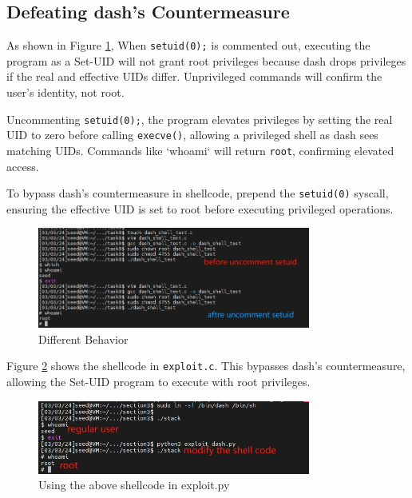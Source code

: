 \documentclass[a4paper,11pt]{article}
\begin{document}
\subsection{Defeating dash’s Countermeasure}

As shown in Figure \ref{fig:task11.1}, When \verb|setuid(0);| is commented out, executing the program as a Set-UID will not grant root privileges because dash drops privileges if the real and effective UIDs differ. Unprivileged commands will confirm the user's identity, not root.

Uncommenting \verb|setuid(0);|, the program elevates privileges by setting the real UID to zero before calling \verb|execve()|, allowing a privileged shell as dash sees matching UIDs. Commands like `whoami` will return \verb|root|, confirming elevated access.

To bypass dash's countermeasure in shellcode, prepend the \verb|setuid(0)| syscall, ensuring the effective UID is set to root before executing privileged operations.
\begin{figure}[h]
    \centering
       \includegraphics[width=0.8\textwidth]{figures/task11/task11.1.png}
    \caption{Different Behavior}\label{fig:task11.1}
\end{figure}

Figure \ref{fig:task11.2} shows the shellcode in \verb|exploit.c|. This bypasses dash's countermeasure, allowing the Set-UID program to execute with root privileges.
\begin{figure}[h]
    \centering
       \includegraphics[width=0.8\textwidth]{figures/section3/sec3-4.png}
    \caption{Using the above shellcode in exploit.py}\label{fig:task11.2}
\end{figure}
\end{document}
